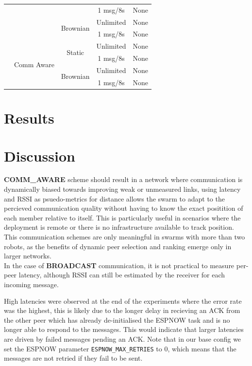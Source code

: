 \documentclass[conference]{IEEEtran}
\begin{document}
\begin{table}[ht]
\begin{tabular}{c|c|c|c|c}
  &   &          & 1 msg/8s & None \\
  \cmidrule{4-5}
  &   & \multirow{2}{*}{Brownian}
                 & Unlimited& None \\
  &   &          & 1 msg/8s & None \\
  \cmidrule{2-5}
  & \multirow{5}{*}{Comm Aware}
    & \multirow{2}{*}{Static}
                 & Unlimited& None \\
  &   &          & 1 msg/8s & None \\
  \cmidrule{4-5}
  &   & \multirow{2}{*}{Brownian}
                 & Unlimited& None \\
  &   &          & 1 msg/8s & None \\
\bottomrule
\end{tabular}
\end{table}

\section{Results}

\section{Discussion}
\textbf{COMM\_AWARE} scheme should result in a network where communication is dynamically biased towards improving weak or unmeasured links, using latency and RSSI as psuedo-metrics for distance allows the swarm to adapt to the percieved communication quality without having to know the exact positition of each member relative to itself. This is particularly useful in scenarios where the deployment is remote or there is no infrastructure available to track position. This communication schemes are only meaningful in swarms with more than two robots, as the benefits of dynamic peer selection and ranking emerge only in larger networks. \\

In the case of \textbf{BROADCAST} communication, it is not practical to measure per-peer latency, although RSSI can still be estimated by the receiver for each incoming message.

High latencies were observed at the end of the experiments where the error rate was the highest, this is likely due to the longer delay in recieving an ACK from the other peer which has already de-initialised the ESPNOW task and is no longer able to respond to the messages. This would indicate that larger latencies are driven by failed messages pending an ACK. Note that in our base config we set the ESPNOW parameter \texttt{ESPNOW\_MAX\_RETRIES} to 0, which means that the messages are not retried if they fail to be sent.\\
\end{document}
